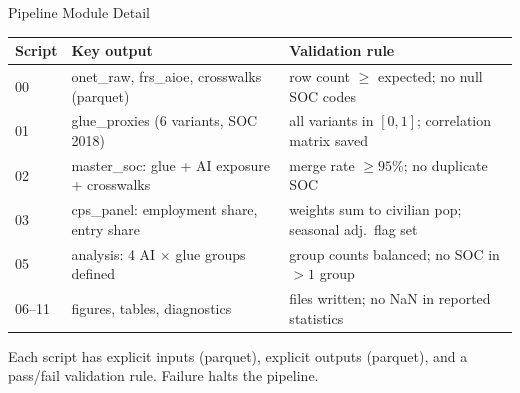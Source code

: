 \documentclass[10pt,english,aspectratio=169]{beamer}
\begin{document}
\begin{frame}{Pipeline Module Detail}
\small
\begin{tabular}{p{1.1cm}p{5.6cm}p{5.5cm}}
\toprule
Script & Key output & Validation rule \\
\midrule
00 & onet\_raw, frs\_aioe, crosswalks (parquet) & row count $\geq$ expected; no null SOC codes \\
01 & glue\_proxies (6 variants, SOC 2018) & all variants in $[0,1]$; correlation matrix saved \\
02 & master\_soc: glue + AI exposure + crosswalks & merge rate $\geq 95\%$; no duplicate SOC \\
03 & cps\_panel: employment share, entry share & weights sum to civilian pop; seasonal adj.\ flag set \\
05 & analysis: 4 AI $\times$ glue groups defined & group counts balanced; no SOC in $>1$ group \\
06--11 & figures, tables, diagnostics & files written; no NaN in reported statistics \\
\bottomrule
\end{tabular}
\vspace{0.3cm}
Each script has explicit inputs (parquet), explicit outputs (parquet), and a pass/fail validation rule. Failure halts the pipeline.
\end{frame}
\end{document}
